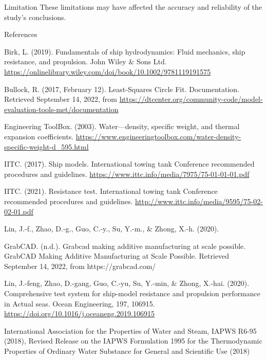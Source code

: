 \documentclass[final, 20pt]{beamer}
\newlength{\colwidth}
\begin{document}
\begin{frame}[t]
\begin{columns}[t]
\begin{column}{\colwidth}
\begin{block}{Limitation}
        These limitations may have affected the accuracy and reliability of the study's conclusions.
      \end{block}

      \vfill

      \begin{block}{References}
        \tiny
        \begin{multicols}{2}

          \begin{hangparas}{0.5in}{1}
            Birk, L. (2019). Fundamentals of ship hydrodynamics: Fluid mechanics, ship resistance, and propulsion. John Wiley \& Sons Ltd. \url{https://onlinelibrary.wiley.com/doi/book/10.1002/9781119191575}

            Bullock, R. (2017, February 12). Least-Squares Circle Fit. Documentation. Retrieved September 14, 2022, from \url{https://dtcenter.org/community-code/model-evaluation-tools-met/documentation}

            Engineering ToolBox. (2003). Water---density, specific weight, and thermal expansion coeﬀicients. \url{https://www.engineeringtoolbox.com/water-density-specific-weight-d_595.html}

            IITC. (2017). Ship models. International towing tank Conference recommended procedures and guidelines. \url{https://www.ittc.info/media/7975/75-01-01-01.pdf}

            IITC. (2021). Resistance test. International towing tank Conference recommended procedures and guidelines. \url{http://www.ittc.info/media/9595/75-02-02-01.pdf}

            Lin, J.-f., Zhao, D.-g., Guo, C.-y., Su, Y.-m., \& Zhong, X.-h. (2020).

            GrabCAD. (n.d.). Grabcad making additive manufacturing at scale possible. GrabCAD Making Additive Manufacturing at Scale Possible. Retrieved September 14, 2022, from https://grabcad.com/

            Lin, J.-feng, Zhao, D.-gang, Guo, C.-yu, Su, Y.-min, \& Zhong, X.-hai. (2020). Comprehensive test system for ship-model resistance and propulsion performance in Actual seas. Ocean Engineering, 197, 106915. \url{https://doi.org/10.1016/j.oceaneng.2019.106915}

            International Association for the Properties of Water and Steam, IAPWS R6-95 (2018), Revised Release on the IAPWS Formulation 1995 for the Thermodynamic Properties of Ordinary Water Substance for General and Scientific Use (2018)
          \end{hangparas}
        \end{multicols}


\end{block}
\end{column}
\end{columns}
\end{frame}
\end{document}
